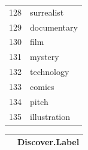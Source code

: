 \documentclass[12pt]{report}   %
\begin{document}
\begin{figure}[h]
\begin{minipage}[h]{0.24\textwidth}
\begin{tabular}{rl}
  128 & surrealist \\ 
  129 & documentary \\ 
  130 & film \\ 
  131 & mystery \\ 
  132 & technology \\ 
  133 & comics \\ 
  134 & pitch \\ 
  135 & illustration \\ 
 \hline
\end{tabular}
    \end{minipage}
\begin{minipage}{0.24\textwidth}

\begin{tabular}[h]{rl}
  \hline
 & Discover.Label \\ 
  \hline


\end{tabular}
\end{minipage}
\end{figure}
\end{document}
